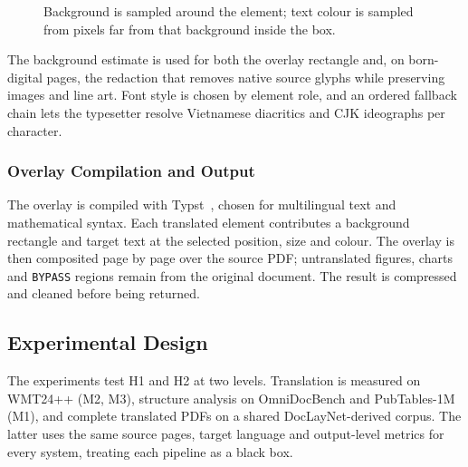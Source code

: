 \begin{figure}[H]
    \centering
    \caption{Background is sampled around the element; text colour is sampled
    from pixels far from that background inside the box.}
    \label{fig:colour-sampling}
\end{figure}

The background estimate is used for both the overlay rectangle and, on
born-digital pages, the redaction that removes native source glyphs while
preserving images and line art. Font style is chosen by element role, and an
ordered fallback chain lets the typesetter resolve Vietnamese diacritics and CJK
ideographs per character.

\subsubsection{Overlay Compilation and Output}
\label{subsubsec:overlay}

The overlay is compiled with Typst~\citep{typst}, chosen for multilingual text
and mathematical syntax. Each translated element contributes a background
rectangle and target text at the selected position, size and colour. The overlay
is then composited page by page over the source PDF; untranslated figures,
charts and \texttt{BYPASS} regions remain from the original document. The result
is compressed and cleaned before being returned.

\subsection{Experimental Design}
\label{subsec:method-eval}

The experiments test H1 and H2 at two levels. Translation is measured on
WMT24++ (M2, M3), structure analysis on OmniDocBench and PubTables-1M (M1), and
complete translated PDFs on a shared DocLayNet-derived corpus. The latter
uses the same source pages, target language and output-level metrics for every
system, treating each pipeline as a black box.

